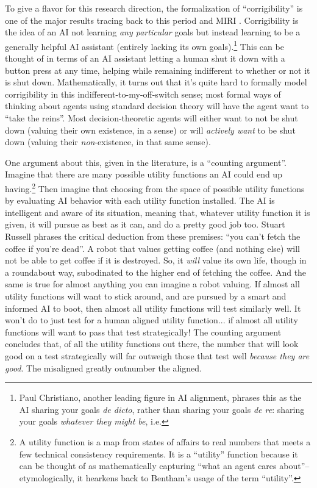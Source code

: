 To give a flavor for this research direction, the formalization of
``corrigibility'' is one of the major results tracing back to this period and
MIRI \cite{soares2015corrigibility}. Corrigibility is the idea of an AI not
learning \emph{any particular} goals but instead learning to be a generally
helpful AI assistant (entirely lacking its own goals).\footnote{Paul
Christiano, another leading figure in AI alignment, phrases this as the AI
sharing your goals \emph{de dicto}, rather than sharing your goals \emph{de
re}: sharing your goals \emph{whatever they might be}, i.e.} This can be
thought of in terms of an AI assistant letting a human shut it down with a
button press at any time, helping while remaining indifferent to whether or not
it is shut down. Mathematically, it turns out that it's quite hard to formally
model corrigibility in this indifferent-to-my-off-switch sense; most formal
ways of thinking about agents using standard decision theory will have the
agent want to ``take the reins''. Most decision-theoretic agents will either
want to not be shut down (valuing their own existence, in a sense) or will
\emph{actively want} to be shut down (valuing their \emph{non}-existence, in
that same sense).

One argument about this, given in the literature, is a ``counting argument''.
Imagine that there are many possible utility functions an AI could end up
having.\footnote{A utility function is a map from states of affairs to real
numbers that meets a few technical consistency requirements. It is a
``utility'' function because it can be thought of as mathematically capturing
``what an agent cares about''--etymologically, it hearkens back to Bentham's
usage of the term ``utility''.} Then imagine that choosing from the space of
possible utility functions by evaluating AI behavior with each utility function
installed. The AI is intelligent and aware of its situation, meaning that,
whatever utility function it is given, it will pursue as best as it can, and do
a pretty good job too. Stuart Russell \cite{russell2019human} phrases the
critical deduction from these premises: ``you can't fetch the coffee if you're
dead''. A robot that values getting coffee (and nothing else) will not be able
to get coffee if it is destroyed. So, it \emph{will} value its own life, though
in a roundabout way, subodinated to the higher end of fetching the coffee. And
the same is true for almost anything you can imagine a robot valuing. If almost
all utility functions will want to stick around, and are pursued by a smart and
informed AI to boot, then almost all utility functions will test similarly
well. It won't do to just test for a human aligned utility function... if
almost all utility functions will want to pass that test strategically! The
counting argument concludes that, of all the utility functions out there, the
number that will look good on a test strategically will far outweigh those that
test well \emph{because they are good}. The misaligned greatly outnumber the
aligned.

